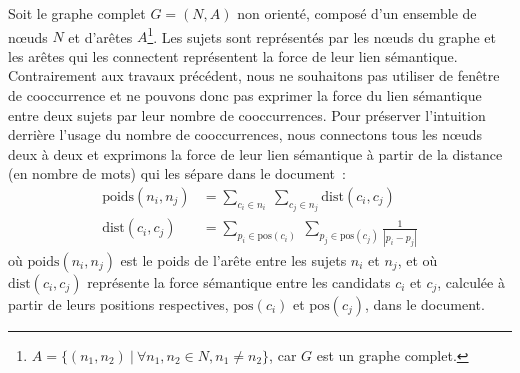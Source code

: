         Soit le graphe complet $G = (N, A)$ non orienté, composé d'un ensemble
        de n\oe{}uds $N$ et d'arêtes $A$\footnote{$A = \{(n_1, n_2)\ |\
        \forall{n_1, n_2 \in N}, n_1 \neq n_2\}$, car $G$ est un graphe
        complet.}. Les sujets sont représentés par les n\oe{}uds du graphe et
        les arêtes qui les connectent représentent la force de leur lien
        sémantique. Contrairement aux travaux précédent, nous ne souhaitons pas
        utiliser de fenêtre de cooccurrence et ne pouvons donc pas exprimer la
        force du lien sémantique entre deux sujets par leur nombre de
        cooccurrences. Pour préserver l'intuition derrière l'usage du nombre de
        cooccurrences, nous connectons tous les n\oe{}uds deux à deux et
        exprimons la force de leur lien sémantique à partir de la distance (en
        nombre de mots) qui les sépare dans le document~:
        \begin{align}
          \text{poids}(n_i, n_j) &= \sum_{c_i \in n_i}\ \sum_{c_j \in n_j} \text{dist}(c_i, c_j) \label{math:ponderation}\\
          \text{dist}(c_i, c_j) &= \sum_{p_i \in \text{pos}(c_i)}\ \sum_{p_j \in \text{pos}(c_j)} \frac{1}{|p_i - p_j|} \label{math:distance}
        \end{align}
        où $\text{poids}(n_i, n_j)$ est le poids de l'arête entre les sujets
        $n_i$ et $n_j$, et où $\text{dist}(c_i, c_j)$ représente la force
        sémantique entre les candidats $c_i$ et $c_j$, calculée à partir de
        leurs positions respectives, $\text{pos}(c_i)$ et $\text{pos}(c_j)$,
        dans le document.


